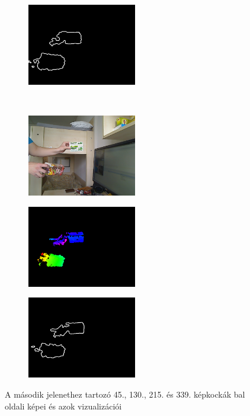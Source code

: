 \begin{figure}[b!]
\begin{subfigure}[b]{.32\linewidth}
  \end{subfigure}
\begin{subfigure}[b]{.32\linewidth}
	\centering
	\includegraphics[width=135pt]{figures/scene2/ctr_215.png}
  \end{subfigure}\\\vspace{5pt}
  \begin{subfigure}[b]{.32\linewidth}
	\centering
	\includegraphics[width=135pt]{figures/scene2/left_339.png}
  \end{subfigure}
\begin{subfigure}[b]{.32\linewidth}
	\centering
	\includegraphics[width=135pt]{figures/scene2/vis_339.png}
  \end{subfigure}
\begin{subfigure}[b]{.32\linewidth}
	\centering
	\includegraphics[width=135pt]{figures/scene2/ctr_339.png}
  \end{subfigure}
\caption{A második jelenethez tartozó 45., 130., 215. és 339. képkockák bal oldali képei és azok vizualizációi \label{fig:scene2_frames}}
\end{figure}

